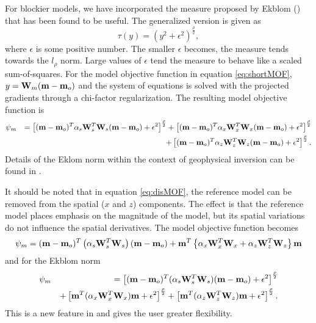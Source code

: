 For blockier models, we have incorporated the measure proposed by Ekblom (\citeyear{Ekblom73,Ekblom87}) that has been found to be useful. The generalized version is given as
\begin{equation}
\label{eq:Ekblom}
\tau(y) = (y^2 + \epsilon^2)^{\frac{\rho}{2}},
\end{equation}
where $\epsilon$ is some positive number. The smaller $\epsilon$ becomes, the measure tends towards the $l_\rho$ norm. Large values of $\epsilon$ tend the measure to behave like a scaled sum-of-squares. For the model objective function in equation \ref{eq:shortMOF}, $y = \mathbf{W}_m(\mathbf{m} - \mathbf{m}_o)$ and the system of equations is solved with the projected gradients through a chi-factor regularization. The resulting model objective function is 
%
\begin{eqnarray}
\psi_m &&= \left[(\mathbf{m} - \mathbf{m}_o)^T\alpha_s\mathbf{W}^T_s\mathbf{W}_s(\mathbf{m} - \mathbf{m}_o) + \epsilon^2\right]^{\frac{\rho}{2}} + \left[(\mathbf{m} - \mathbf{m}_o)^T\alpha_x\mathbf{W}^T_x\mathbf{W}_x(\mathbf{m} - \mathbf{m}_o) + \epsilon^2 \right]^{\frac{\rho}{2}} \nonumber \\
&&+ \left[(\mathbf{m} - \mathbf{m}_o)^T\alpha_z\mathbf{W}^T_z\mathbf{W}_z(\mathbf{m} - \mathbf{m}_o) + \epsilon^2 \right]^{\frac{\rho}{2}}.
\label{eq:ekblom}
\end{eqnarray}
%
Details of the Eklom norm within the context of geophysical inversion can be found in \cite{FarquharsonOldenburg98}. 

It should be noted that in equation \ref{eq:disMOF}, the reference model can be removed from the spatial ($x$ and $z$) components. The effect is that the reference model places emphasis on the magnitude of the model, but its spatial variations do not influence the spatial derivatives. The model objective function becomes
\begin{equation}
\psi_m = (\mathbf{m}-\mathbf{m}_o)^T\left(\alpha_s \mathbf{W}_s^T\mathbf{W}_s\right)(\mathbf{m}-\mathbf{m}_o) + \mathbf{m}^T\left\{\alpha_x \mathbf{W}_x^T\mathbf{W}_x+\alpha_z \mathbf{W}_z^T\mathbf{W}_z \right\}\mathbf{m}
\label{eq:mofNOref}
\end{equation}
%
and for the Ekblom norm
%
\begin{eqnarray}
\psi_m &&= \left[(\mathbf{m} - \mathbf{m}_o)^T(\alpha_s\mathbf{W}^T_s\mathbf{W}_s)(\mathbf{m} - \mathbf{m}_o) + \epsilon^2 \right]^{\frac{\rho}{2}} \nonumber \\
&&+ \left[\mathbf{m}^T(\alpha_x\mathbf{W}^T_x\mathbf{W}_x)\mathbf{m} + \epsilon^2 \right]^{\frac{\rho}{2}} + \left[\mathbf{m}^T(\alpha_z\mathbf{W}^T_z\mathbf{W}_z)\mathbf{m} + \epsilon^2 \right]^{\frac{\rho}{2}}.
\end{eqnarray}
This is a new feature in  and gives the user greater flexibility. 
% 

